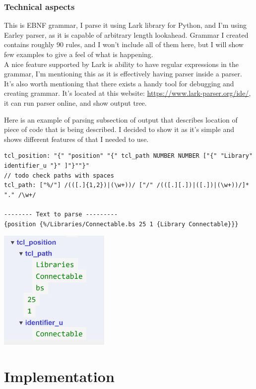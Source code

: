 \documentclass[14pt]{report}
\begin{document}
\subsection{Technical aspects}
This is EBNF grammar, I parse it using Lark library for Python, and I'm using Earley parser, as it is capable of arbitrary length lookahead. Grammar I created contains roughly 90 rules, and I won't include all of them here, but I will show few examples to give a feel of what is happening. 
\\
A nice feature supported by Lark is ability to have regular expressions in the grammar, I'm mentioning this as it is effectively having parser inside a parser. It's also worth mentioning that there exists a handy tool for debugging and creating grammar. It's located at this website: \href{https://www.lark-parser.org/ide/}{https://www.lark-parser.org/ide/}, it can run parser online, and show output tree.
\begin{tcolorbox}[title = Parsing position TODO maybe find a better example with shorter line]
    Here is an example of parsing subsection of output that describes location of piece of code that is being described. I decided to show it as it's simple and shows different features of that I needed to use.
    \begin{verbatim}
tcl_position: "{" "position" "{" tcl_path NUMBER NUMBER ["{" "Library" identifier_u "}" ]"}""}"
// todo check paths with spaces
tcl_path: ["%/"] /(([.]{1,2})|(\w+))/ ["/" /(([.][.])|([.])|(\w+))/]* "." /\w+/

-------- Text to parse ---------
{position {%/Libraries/Connectable.bs 25 1 {Library Connectable}}}
    \end{verbatim}
    \includegraphics[width=0.4\textwidth]{images/TCLPath.png}
\end{tcolorbox}


\chapter{Implementation}
\end{document}
